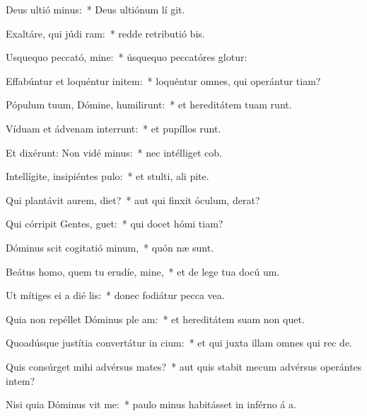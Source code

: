 \item Deus ultió minus:~* Deus ultiónum lí git.
\item Exaltáre, qui júdi ram:~* redde retributió bis.
\item Usquequo peccató, mine:~* úsquequo peccatóres glotur:
\item Effabúntur et loquéntur initem:~* loquéntur omnes, qui operántur tiam?
\item Pópulum tuum, Dómine, humilirunt:~* et hereditátem tuam runt.
\item Víduam et ádvenam interrunt:~* et pupíllos runt.
\item Et dixérunt: Non vidé minus:~* nec intélliget  cob.
\item Intellígite, insipiéntes  pulo:~* et stulti, ali pite.
\item Qui plantávit aurem,  diet?~* aut qui finxit óculum,  derat?
\item Qui córripit Gentes,  guet:~* qui docet hómi tiam?
\item Dóminus scit cogitatió minum,~* quón næ sunt.
\item Beátus homo, quem tu erudíe, mine,~* et de lege tua docú um.
\item Ut mítiges ei a dié lis:~* donec fodiátur pecca vea.
\item Quia non repéllet Dóminus ple am:~* et hereditátem suam non quet.
\item Quoadúsque justítia convertátur in cium:~* et qui juxta illam omnes qui rec  de.
\item Quis consúrget mihi advérsus mates?~* aut quis stabit mecum advérsus operántes intem?
\item Nisi quia Dóminus vit me:~* paulo minus habitásset in inférno á a.
